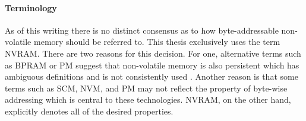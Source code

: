 \paragraph{Terminology}

As of this writing there is no distinct consensus as to how byte-addressable
non-volatile memory should be referred to. This thesis exclusively uses the term
\ac{NVRAM}. There are two reasons for this decision. For one, alternative terms
such as \ac{BPRAM} or \ac{PM} suggest that non-volatile memory is also
persistent which has ambiguous definitions and is not consistently used
\cite{volos2017whisper}. Another reason is that some terms such as \ac{SCM},
\ac{NVM}, and \ac{PM} may not reflect the property of byte-wise addressing which
is central to these technologies. \ac{NVRAM}, on the other hand, explicitly
denotes all of the desired properties.
